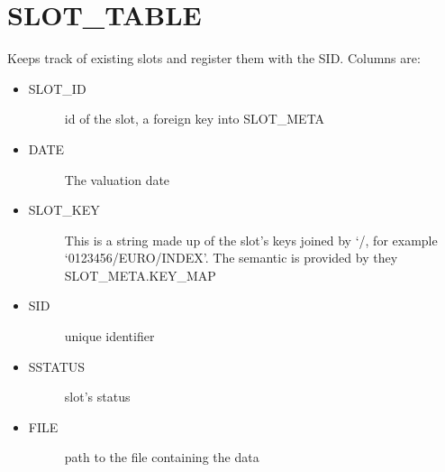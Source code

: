 \documentclass[letterpaper,10pt,english]{sphinxmanual}
\begin{document}
\section{SLOT\_TABLE}
\label{\detokenize{mrb:slot-table}}
Keeps track of existing slots and register them with the SID.
Columns are:
\begin{itemize}
\item {} \begin{description}
\item[{SLOT\_ID}] \leavevmode
id of the slot, a foreign key into SLOT\_META

\end{description}

\item {} \begin{description}
\item[{DATE}] \leavevmode
The valuation date

\end{description}

\item {} \begin{description}
\item[{SLOT\_KEY}] \leavevmode
This is a string made up of the slot’s keys joined by ‘/, for
example ‘0123456/EURO/INDEX’. The semantic is provided by they
SLOT\_META.KEY\_MAP

\end{description}

\item {} \begin{description}
\item[{SID}] \leavevmode
unique identifier

\end{description}

\item {} \begin{description}
\item[{SSTATUS}] \leavevmode
slot’s status

\end{description}

\item {} \begin{description}
\item[{FILE}] \leavevmode
path to the file containing the data

\end{description}

\end{itemize}
\end{document}
